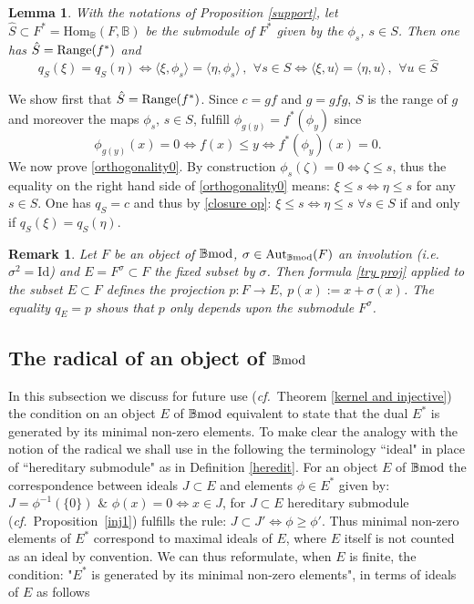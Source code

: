 \documentclass[12pt]{article}
\newtheorem{lem}[thm]{Lemma}
\newtheorem{rem}[thm]{Remark}
\def\Aut{{\rm Aut}}
\def\Hom{{\rm Hom}}
\def\id{{\rm id}}
\def\B{{\mathbb B}}
\def\qqq{\,,\,~\forall}
\newcommand{\ie}{{\it i.e.\/}\ }
\newcommand{\cf}{{\it cf.}}
\def\id{{\mbox{Id}}}
\def\Hom {{\mbox{Hom}}}
\def\bmod{{\rm \B mod}}
\begin{document}
   \begin{lem}\label{ortho proj0} With the notations of  Proposition \ref{support}, let $\hat S\subset F^*=\Hom_\B(F,\B)$ be the submodule of $F^*$ given by the $\phi_s$, $s\in S$. Then one has $\hat S={\rm Range}(f^*)$ and
   \begin{equation}\label{orthogonality0}
  	q_S(\xi)=q_S(\eta)\iff \langle\xi,\phi_s\rangle=\langle\eta,\phi_s\rangle\qqq s\in S\iff 
  	 \langle\xi,u\rangle=\langle\eta,u\rangle\qqq u\in \hat S
  \end{equation}  
     \end{lem}
   \proof We show first that $\hat S={\rm Range}(f^*)$. Since $c=gf$ and $g=gfg$,  $S$ is the range of $g$ and moreover the maps $\phi_s$, $s\in S$, fulfill $\phi_{g(y)}=f^*(\phi_y)$ since
   $$
   \phi_{g(y)}(x)=0\iff f(x)\leq y \iff f^*(\phi_y)(x)=0.
   $$
   We now prove \eqref{orthogonality0}. By construction $\phi_s(\zeta)=0\iff \zeta\leq s$, thus the equality on the right hand side of \eqref{orthogonality0} means: $\xi\leq s\iff \eta\leq s$ for any $s\in S$. One has $q_S=c$ and thus by \eqref{closure op}: $\xi\leq s\iff \eta\leq s$ $\forall s\in S$ if and only if $q_S(\xi)=q_S(\eta)$.
     \endproof 

\begin{rem}\label{projonfix} Let $F$ be an object of $\bmod$, $\sigma\in \Aut_\bmod(F)$ an involution (\ie $\sigma^2=\id$) and $E=F^\sigma\subset F$ the fixed subset by $\sigma$.  Then formula \eqref{try proj} applied to the subset $E\subset F$ defines the projection $p: F\to E,~p(x):=x+\sigma(x)$. The equality $q_E=p$ shows that $p$ only depends upon the submodule $F^\sigma$.	
\end{rem}

\subsection{The radical of an object of $\bmod$}\label{section radical}

In this subsection we discuss for future use (\cf~Theorem \ref{kernel and injective}) the condition on   an object $E$ of $\bmod$ equivalent to state  that the dual $E^*$ is generated by its minimal non-zero elements. To make clear the analogy with the notion of the radical  we shall use in the following the terminology ``ideal" in place of ``hereditary submodule" as in Definition \ref{heredit}. 
 For an object $E$ of $\bmod$ the correspondence between ideals $J\subset E$ and elements $\phi\in E^*$ given by: $J=\phi^{-1}(\{0\})$ \& $\phi(x)=0 \Leftrightarrow x\in J$, for $J\subset E$ hereditary submodule (\cf~Proposition~\ref{inj1}) fulfills the rule: $J\subset J'\Leftrightarrow \phi\geq \phi'$. Thus minimal non-zero elements of $E^*$ correspond to maximal ideals of $E$, where $E$ itself is not counted as an ideal by convention. We can thus reformulate, when $E$ is finite, the condition: "$E^*$ is generated by its minimal non-zero  elements", in terms of ideals of $E$ as follows\vspace{.05in}
 
\end{document}
